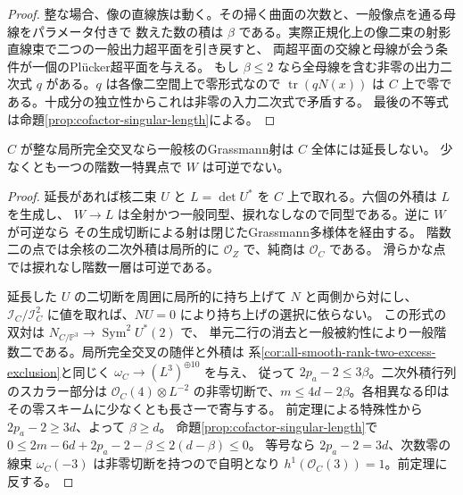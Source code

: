 \begin{proof}
整な場合、像の直線族は動く。その掃く曲面の次数と、一般像点を通る母線をパラメータ付きで
数えた数の積は $\beta$ である。実際正規化上の像二束の射影直線束で二つの一般出力超平面を引き戻すと、
両超平面の交線と母線が会う条件が一個のPlücker超平面を与える。
もし $\beta\le2$ なら全母線を含む非零の出力二次式 $q$ がある。$q$ は各像二空間上で零形式なので
$\operatorname{tr}(qN(x))$ は $C$ 上で零である。十成分の独立性からこれは非零の入力二次式で矛盾する。
最後の不等式は命題\ref{prop:cofactor-singular-length}による。
\end{proof}

\begin{proposition}\label{prop:cofactor-lci-kernel-extension}
$C$ が整な局所完全交叉なら一般核のGrassmann射は $C$ 全体には延長しない。
少なくとも一つの階数一特異点で $W$ は可逆でない。
\end{proposition}
\begin{proof}
延長があれば核二束 $U$ と $L=\det U^*$ を $C$ 上で取れる。六個の外積は $L$ を生成し、
$W\to L$ は全射かつ一般同型、捩れなしなので同型である。逆に $W$ が可逆なら
その生成切断による射は閉じたGrassmann多様体を経由する。
階数二の点では余核の二次外積は局所的に $\mathcal O_Z$ で、純商は $\mathcal O_C$ である。
滑らかな点では捩れなし階数一層は可逆である。

延長した $U$ の二切断を周囲に局所的に持ち上げて $N$ と両側から対にし、
$\mathcal I_C/\mathcal I_C^2$ に値を取れば、$NU=0$ により持ち上げの選択に依らない。
この形式の双対は $N_{C/\mathbb P^3}\to\operatorname{Sym}^2U^*(2)$ で、
単元二行の消去と一般被約性により一般階数二である。局所完全交叉の随伴と外積は
系\ref{cor:all-smooth-rank-two-excess-exclusion}と同じく $\omega_C\to (L^3)^{\oplus10}$ を与え、
従って $2p_a-2\le3\beta$。二次外積行列のスカラー部分は $\mathcal O_C(4)\otimes L^{-2}$
の非零切断で、$m\le4d-2\beta$。各相異なる印はその零スキームに少なくとも長さ一で寄与する。
前定理による特殊性から $2p_a-2\ge3d$、よって $\beta\ge d$。
命題\ref{prop:cofactor-singular-length}で
$0\le2m-6d+2p_a-2-\beta\le2(d-\beta)\le0$。
等号なら $2p_a-2=3d$、次数零の線束 $\omega_C(-3)$ は非零切断を持つので自明となり
$h^1(\mathcal O_C(3))=1$。前定理に反する。
\end{proof}

